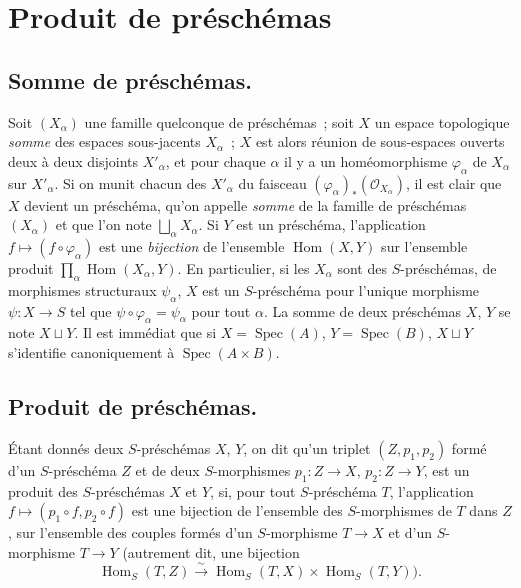 \section{Produit de préschémas}
\label{section:I.3-fr}

\subsection{Somme de préschémas.}
\label{subsection:I.3.1-fr}

\label{I.3.1.1-fr}
Soit $(X_\alpha)$ une famille quelconque de préschémas~; soit $X$ un espace
topologique \emph{somme} des espaces sous-jacents $X_\alpha$~; $X$ est alors
réunion de sous-espaces ouverts deux à deux disjoints $X'_\alpha$, et pour
chaque $\alpha$ il y a un homéomorphisme $\varphi_\alpha$ de $X_\alpha$ sur
$X'_\alpha$. Si on munit chacun des $X'_\alpha$ du faisceau
$(\varphi_\alpha)_*(\mathscr{O}_{X_\alpha})$, il est clair que $X$ devient un
préschéma, qu'on appelle \emph{somme} de la famille de préschémas $(X_\alpha)$
et que l'on note $\bigsqcup_\alpha X_\alpha$. Si $Y$ est un préschéma,
l'application $f\mapsto(f\circ\varphi_\alpha)$ est une \emph{bijection} de
l'ensemble $\operatorname{Hom}(X,Y)$ sur l'ensemble produit
$\prod_\alpha\operatorname{Hom}(X_\alpha,Y)$. En particulier, si les
$X_\alpha$ sont des $S$-préschémas, de morphismes structuraux $\psi_\alpha$,
$X$ est un $S$-préschéma pour l'unique morphisme $\psi:X\to S$ tel que
$\psi\circ\varphi_\alpha=\psi_\alpha$ pour tout $\alpha$. La somme de deux
préschémas $X$, $Y$ se note $X\sqcup Y$. Il est immédiat que si
$X=\operatorname{Spec}(A)$, $Y=\operatorname{Spec}(B)$, $X\sqcup Y$
s'identifie canoniquement à $\operatorname{Spec}(A\times B)$.

\subsection{Produit de préschémas.}
\label{subsection:I.3.2-fr}

\begin{definition}[3.2.1]
\label{I.3.2.1-fr}
Étant donnés deux $S$-préschémas $X$, $Y$, on dit qu'un triplet
$(Z,p_1,p_2)$ formé d'un $S$-préschéma $Z$ et de deux $S$-morphismes
$p_1:Z\to X$, $p_2:Z\to Y$, est un produit des
$S$-préschémas $X$ et $Y$, si, pour tout $S$-préschéma $T$, l'application
$f\mapsto(p_1\circ f,p_2\circ f)$ est une bijection de l'ensemble des
$S$-morphismes de $T$ dans $Z$, sur l'ensemble des couples formés d'un
$S$-morphisme $T\to X$ et d'un $S$-morphisme $T\to Y$ (autrement dit, une
bijection
\[
  \operatorname{Hom}_S(T,Z)\xrightarrow{\sim}
  \operatorname{Hom}_S(T,X)\times\operatorname{Hom}_S(T,Y)).
\]
\end{definition}

